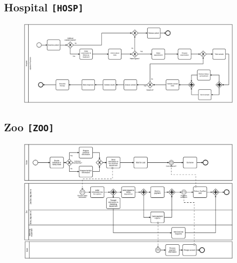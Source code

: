 \clearpage


\begin{landscape}
\thispagestyle{empty}
\section*{Hospital \texttt{[HOSP]}}
\begin{figure}[!h]
    \centering
    \includegraphics[width=1.3\textwidth]{figures/benchmark/Hospital.png}
\end{figure}
\end{landscape}


\begin{landscape}
\thispagestyle{empty}
\section*{Zoo \texttt{[ZOO]}}
\begin{figure}[!h]
    \centering
    \includegraphics[width=1.3\textwidth]{figures/benchmark/Zoo.png}
\end{figure}
\end{landscape}




